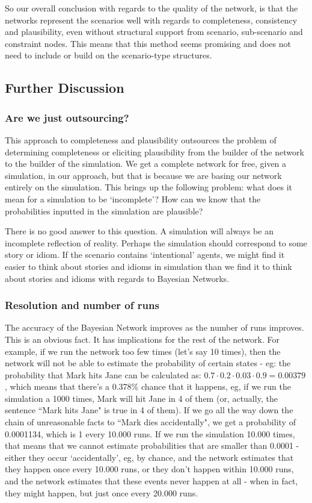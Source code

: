 So our overall conclusion with regards to the quality of the network, is that the networks represent the scenarios well with regards to completeness, consistency and plausibility, even without structural support from scenario, sub-scenario and constraint nodes. This means that this method seems promising and does not need to include or build on the scenario-type structures.

\subsection{Further Discussion}


\subsubsection{Are we just outsourcing?}

This approach to completeness and plausibility outsources the problem of determining completeness or eliciting plausibility from the builder of the network to the builder of the simulation. We get a complete network for free, given a simulation, in our approach, but that is because we are basing our network entirely on the simulation. This brings up the following problem: what does it mean for a simulation to be `incomplete'? How can we know that the probabilities inputted in the simulation are plausible?

 There is no good answer to this question. A simulation will always be an incomplete reflection of reality. Perhaps the simulation should correspond to some story or idiom. If the scenario contains `intentional' agents, we might find it easier to think about stories and idioms in simulation than we find it to think about stories and idioms with regards to Bayesian Networks.



\subsubsection{Resolution and number of runs}
The accuracy of the Bayesian Network improves as the number of runs improves. This is an obvious fact. It has implications for the rest of the network. For example, if we run the network too few times (let's say 10 times), then the network will not be able to estimate the probability of certain states - eg: the probability that Mark hits Jane can be calculated as: $0.7 \cdot 0.2 \cdot 0.03 \cdot 0.9 = 0.00379$, which means that there's a 0.378\% chance that it happens, eg, if we run the simulation a 1000 times, Mark will hit Jane in 4 of them (or, actually, the sentence ``Mark hits Jane" is true in 4 of them). If we go all the way down the chain of unreasonable facts to ``Mark dies accidentally", we get a probability of 0.0001134, which is 1 every 10.000 runs. If we run the simulation 10.000 times, that means that we cannot estimate probabilities that are smaller than 0.0001 - either they occur `accidentally', eg, by chance, and the network estimates that they happen once every 10.000 runs, or they don't happen within 10.000 runs, and the network estimates that these events never happen at all - when in fact, they might happen, but just once every 20.000 runs.

